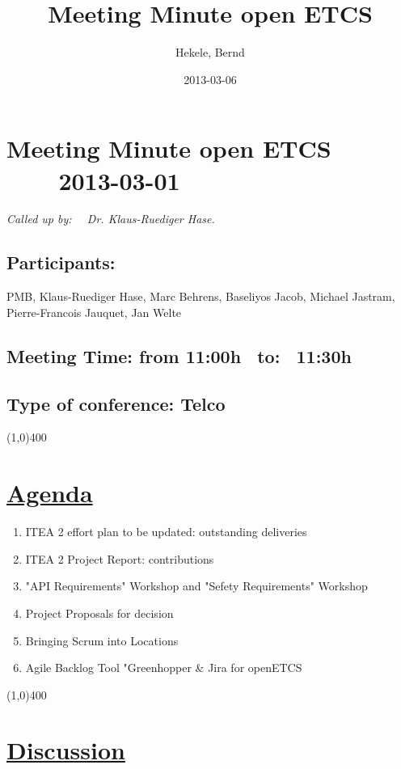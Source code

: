 \documentclass[a4paper]{article}
\title{Meeting Minute open ETCS}
\author{Hekele, Bernd}
\date{2013-03-06}
\begin{document}
\section*{\large{Meeting Minute open ETCS \ \ \ \ 2013-03-01}}

\large{\emph{Called up by: \ \  Dr. Klaus-Ruediger Hase.}}

\subsection*{Participants:} PMB, Klaus-Ruediger Hase, Marc Behrens, Baseliyos Jacob, Michael Jastram, Pierre-Francois Jauquet, Jan Welte\\

\subsection*{Meeting Time: from 11:00h \ to: \ 11:30h}

\subsection*{Type of conference: Telco}

\line(1,0){400}
\section*{\underline{Agenda}}
\begin{enumerate}
\item ITEA 2 effort plan to be updated: outstanding deliveries
\item ITEA 2 Project Report: contributions
\item "API Requirements" Workshop and "Sefety Requirements" Workshop
\item Project Proposals for decision
\item Bringing Scrum into Locations
\item Agile Backlog Tool "Greenhopper \& Jira for openETCS

\end{enumerate}
\line(1,0){400}
\section*{\underline{Discussion}}
\end{document}
